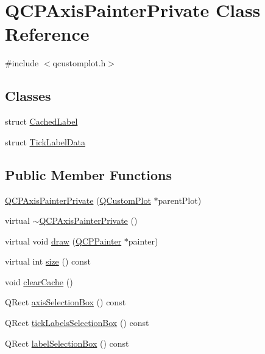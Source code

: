 \hypertarget{class_q_c_p_axis_painter_private}{}\section{Q\+C\+P\+Axis\+Painter\+Private Class Reference}
\label{class_q_c_p_axis_painter_private}


{\ttfamily \#include $<$qcustomplot.\+h$>$}

\subsection*{Classes}
\begin{DoxyCompactItemize}
\item 
struct \hyperlink{struct_q_c_p_axis_painter_private_1_1_cached_label}{Cached\+Label}
\item 
struct \hyperlink{struct_q_c_p_axis_painter_private_1_1_tick_label_data}{Tick\+Label\+Data}
\end{DoxyCompactItemize}
\subsection*{Public Member Functions}
\begin{DoxyCompactItemize}
\item 
\hyperlink{class_q_c_p_axis_painter_private_a0f14aa5c4aa83dbcd68984a7c73bf94f}{Q\+C\+P\+Axis\+Painter\+Private} (\hyperlink{class_q_custom_plot}{Q\+Custom\+Plot} $\ast$parent\+Plot)
\item 
virtual \hyperlink{class_q_c_p_axis_painter_private_a7c7f95313f0f78c3c3975f822a5fea35}{$\sim$\+Q\+C\+P\+Axis\+Painter\+Private} ()
\item 
virtual void \hyperlink{class_q_c_p_axis_painter_private_a0207a99bdf9c4f70af20928898ddc2fc}{draw} (\hyperlink{class_q_c_p_painter}{Q\+C\+P\+Painter} $\ast$painter)
\item 
virtual int \hyperlink{class_q_c_p_axis_painter_private_a8b2dc0bd2ccbf6bd450733ec9e410a38}{size} () const 
\item 
void \hyperlink{class_q_c_p_axis_painter_private_a7b6806e32c44384fd0ae4dcdaa72b1b5}{clear\+Cache} ()
\item 
Q\+Rect \hyperlink{class_q_c_p_axis_painter_private_aaf93529ac60215ea020cdff5635c3e80}{axis\+Selection\+Box} () const 
\item 
Q\+Rect \hyperlink{class_q_c_p_axis_painter_private_af02fc189ab8460c202eb4138c9aca516}{tick\+Labels\+Selection\+Box} () const 
\item 
Q\+Rect \hyperlink{class_q_c_p_axis_painter_private_ae907476bf8cf0ecd17620575e17c06b1}{label\+Selection\+Box} () const 
\end{DoxyCompactItemize}
